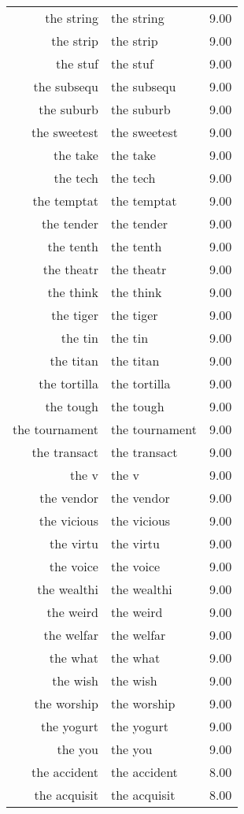 \begin{table}[ht]
\begin{tabular}{rlr}
  the string & the string & 9.00 \\ 
  the strip & the strip & 9.00 \\ 
  the stuf & the stuf & 9.00 \\ 
  the subsequ & the subsequ & 9.00 \\ 
  the suburb & the suburb & 9.00 \\ 
  the sweetest & the sweetest & 9.00 \\ 
  the take & the take & 9.00 \\ 
  the tech & the tech & 9.00 \\ 
  the temptat & the temptat & 9.00 \\ 
  the tender & the tender & 9.00 \\ 
  the tenth & the tenth & 9.00 \\ 
  the theatr & the theatr & 9.00 \\ 
  the think & the think & 9.00 \\ 
  the tiger & the tiger & 9.00 \\ 
  the tin & the tin & 9.00 \\ 
  the titan & the titan & 9.00 \\ 
  the tortilla & the tortilla & 9.00 \\ 
  the tough & the tough & 9.00 \\ 
  the tournament & the tournament & 9.00 \\ 
  the transact & the transact & 9.00 \\ 
  the v & the v & 9.00 \\ 
  the vendor & the vendor & 9.00 \\ 
  the vicious & the vicious & 9.00 \\ 
  the virtu & the virtu & 9.00 \\ 
  the voice & the voice & 9.00 \\ 
  the wealthi & the wealthi & 9.00 \\ 
  the weird & the weird & 9.00 \\ 
  the welfar & the welfar & 9.00 \\ 
  the what & the what & 9.00 \\ 
  the wish & the wish & 9.00 \\ 
  the worship & the worship & 9.00 \\ 
  the yogurt & the yogurt & 9.00 \\ 
  the you & the you & 9.00 \\ 
  the accident & the accident & 8.00 \\ 
  the acquisit & the acquisit & 8.00 \\ 

\end{tabular}
\end{table}
